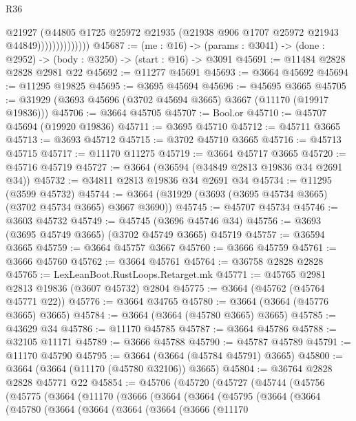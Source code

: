 \begin{lexlean}{R36}
\begin{coremodule}
                            @21927
                            (@44805
                              @1725
                              @25972
                              @21935
                              (@21938 @906 @1707 @25972 @21943 @44849))))))))))))))
@45687 := (me : @16) ->
  (params : @3041) -> (done : @2952) -> (body : @3250) -> (start : @16) -> @3091
@45691 := @11484 @2828 @2828 @2981 @22
@45692 := @11277 @45691
@45693 := @3664 @45692
@45694 := @11295 @19825
@45695 := @3695 @45694
@45696 := @45695 @3665
@45705 := @31929 (@3693 @45696 (@3702 @45694 @3665) @3667 (@11170 (@19917 @19836)))
@45706 := @3664 @45705
@45707 := Bool.or
@45710 := @45707 @45694 (@19920 @19836)
@45711 := @3695 @45710
@45712 := @45711 @3665
@45713 := @3693 @45712
@45715 := @3702 @45710 @3665
@45716 := @45713 @45715
@45717 := @11170 @11275
@45719 := @3664 @45717 @3665
@45720 := @45716 @45719
@45727 := @3664 (@36594 (@34849 @2813 @19836 @34 @2691 @34))
@45732 := @34811 @2813 @19836 @34 @2691 @34
@45734 := @11295 (@3599 @45732)
@45744 := @3664 (@31929 (@3693 (@3695 @45734 @3665) (@3702 @45734 @3665) @3667 @3690))
@45745 := @45707 @45734
@45746 := @3603 @45732
@45749 := @45745 (@3696 @45746 @34)
@45756 := @3693 (@3695 @45749 @3665) (@3702 @45749 @3665) @45719
@45757 := @36594 @3665
@45759 := @3664 @45757 @3667
@45760 := @3666 @45759
@45761 := @3666 @45760
@45762 := @3664 @45761
@45764 := @36758 @2828 @2828
@45765 := LexLeanBoot.RustLoops.Retarget.mk
@45771 := @45765 @2981 @2813 @19836 (@3607 @45732) @2804
@45775 := @3664 (@45762 (@45764 @45771 @22))
@45776 := @3664 @34765
@45780 := @3664 (@3664 (@45776 @3665) @3665)
@45784 := @3664 (@3664 (@45780 @3665) @3665)
@45785 := @43629 @34
@45786 := @11170 @45785
@45787 := @3664 @45786
@45788 := @32105 @11171
@45789 := @3666 @45788
@45790 := @45787 @45789
@45791 := @11170 @45790
@45795 := @3664 (@3664 (@45784 @45791) @3665)
@45800 := @3664 (@3664 (@11170 (@45780 @32106)) @3665)
@45804 := @36764 @2828 @2828 @45771 @22
@45854 := @45706
    (@45720
      (@45727
        (@45744
          (@45756
            (@45775
              (@3664
                (@11170
                  (@3666
                    (@3664
                      (@3664
                        (@45795
                          (@3664
                            (@3664
                              (@45780
                                (@3664
                                  (@3664
                                    (@3664
                                      (@3664
                                        (@3666
                                          (@11170

\end{coremodule}
\end{lexlean}

